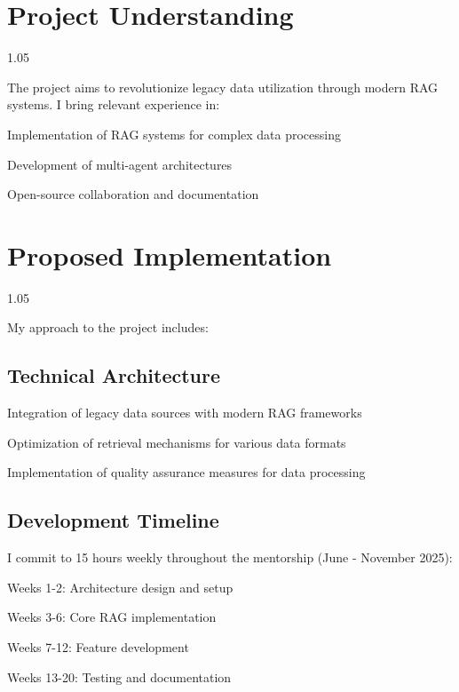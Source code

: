 \documentclass[10pt, letterpaper]{article}
\newenvironment{proposalsection}{
    \begin{spacing}{1.05}
    \begin{minipage}{\linewidth}
    \setlength{\parskip}{0.15cm}
}{
    \end{minipage}
    \end{spacing}
    \vspace{0.05cm}}
\begin{document}
\section{Project Understanding}
\begin{proposalsection}
The project aims to revolutionize legacy data utilization through modern RAG systems. I bring relevant experience in:

\begin{proposallist}
\item Implementation of RAG systems for complex data processing
\item Development of multi-agent architectures
\item Open-source collaboration and documentation
\end{proposallist}
\end{proposalsection}

\section{Proposed Implementation}
\begin{proposalsection}
My approach to the project includes:

\subsection{Technical Architecture}
\begin{proposallist}
\item Integration of legacy data sources with modern RAG frameworks
\item Optimization of retrieval mechanisms for various data formats
\item Implementation of quality assurance measures for data processing
\end{proposallist}

\subsection{Development Timeline}
I commit to 15 hours weekly throughout the mentorship (June - November 2025):
\begin{proposallist}
\item Weeks 1-2: Architecture design and setup
\item Weeks 3-6: Core RAG implementation
\item Weeks 7-12: Feature development
\item Weeks 13-20: Testing and documentation
\end{proposallist}
\end{proposalsection}
\end{document}
